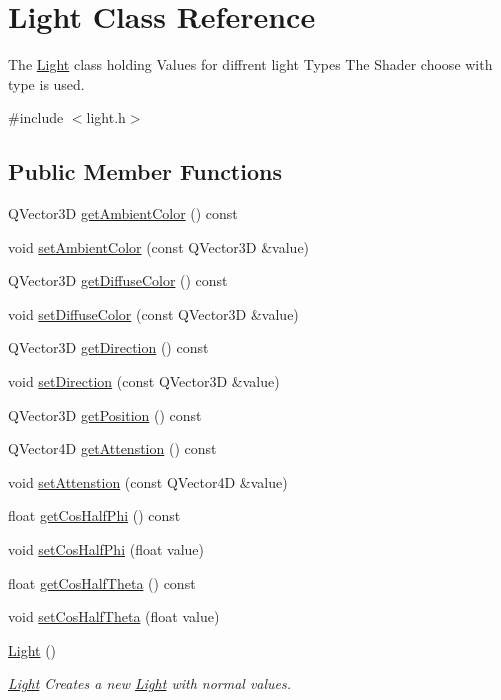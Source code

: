 \hypertarget{class_light}{}\section{Light Class Reference}
\label{class_light}


The \hyperlink{class_light}{Light} class holding Values for diffrent light Types The Shader choose with type is used.  




{\ttfamily \#include $<$light.\+h$>$}

\subsection*{Public Member Functions}
\begin{DoxyCompactItemize}
\item 
Q\+Vector3\+D \hyperlink{class_light_abc98e7a0deaef970249b24b99fbfe2af}{get\+Ambient\+Color} () const 
\item 
void \hyperlink{class_light_ab1d1e7a1f677eac15b3fee85af6e19af}{set\+Ambient\+Color} (const Q\+Vector3\+D \&value)
\item 
Q\+Vector3\+D \hyperlink{class_light_a1fd761051fe5ae7e0b63ccb9a2e70559}{get\+Diffuse\+Color} () const 
\item 
void \hyperlink{class_light_ad9622cbcca5b9918094b29ae1e3e11d0}{set\+Diffuse\+Color} (const Q\+Vector3\+D \&value)
\item 
Q\+Vector3\+D \hyperlink{class_light_a58a17d6d8c1e107425a548f151e95eb6}{get\+Direction} () const 
\item 
void \hyperlink{class_light_a59366d8b8970a990a1a7ec10089c66f9}{set\+Direction} (const Q\+Vector3\+D \&value)
\item 
Q\+Vector3\+D \hyperlink{class_light_a0755863d1018d6dae555765d1698854e}{get\+Position} () const 
\item 
Q\+Vector4\+D \hyperlink{class_light_ad73fb358c98f26624bdf6476267ff56b}{get\+Attenstion} () const 
\item 
void \hyperlink{class_light_a4955734440953fd7ea593cf6f7734113}{set\+Attenstion} (const Q\+Vector4\+D \&value)
\item 
float \hyperlink{class_light_a26c205e4785b96e13017c8bec807b406}{get\+Cos\+Half\+Phi} () const 
\item 
void \hyperlink{class_light_ae801b5a8477448649e741051a97c4476}{set\+Cos\+Half\+Phi} (float value)
\item 
float \hyperlink{class_light_af8d37302912489269b84d8b1981f8295}{get\+Cos\+Half\+Theta} () const 
\item 
void \hyperlink{class_light_a6da8d4a84ee9492412525c317c9e37fd}{set\+Cos\+Half\+Theta} (float value)
\item 
\hyperlink{class_light_aeb5df09a25a32f19fdffa761268ba24f}{Light} ()
\begin{DoxyCompactList}\small\item\em \hyperlink{class_light}{Light} Creates a new \hyperlink{class_light}{Light} with normal values. \end{DoxyCompactList}\end{DoxyCompactItemize}
